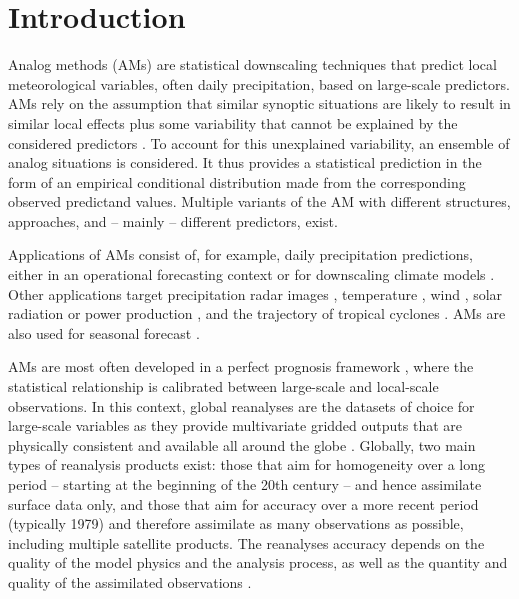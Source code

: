 \documentclass[alpha-refs]{wiley-article}
\begin{document}
\linenumbers

\section{Introduction}

Analog methods (AMs) are statistical downscaling techniques that predict local meteorological variables, often daily precipitation, based on large-scale predictors. AMs rely on the assumption that similar synoptic situations are likely to result in similar local effects plus some variability that cannot be explained by the considered predictors \citep{Lorenz1969}. To account for this unexplained variability, an ensemble of analog situations is considered. It thus provides a statistical prediction in the form of an empirical conditional distribution made from the corresponding observed predictand values. Multiple variants of the AM with different structures, approaches, and -- mainly -- different predictors, exist.

Applications of AMs consist of, for example, daily precipitation predictions, either in an operational forecasting context \citep[e.g.][]{Bontron2005, Hamill2006, Bliefernicht2010, Marty2012, Horton2012, Hamill2015, BenDaoud2016} or for downscaling climate models \citep[e.g.][]{Zorita1999, Wetterhall2005, Wetterhall2007, Matulla2007, Radanovics2013, Chardon2014, Dayon2015, Raynaud2016b}. Other applications target precipitation radar images \citep{Panziera2011, Foresti2015a}, temperature \citep{Kruizinga1983, DelleMonache2013, Caillouet2016, Raynaud2016b}, wind \citep{DelleMonache2013, DelleMonache2011, Vanvyve2015, Alessandrini2015, Junk2015, Junk2015c}, solar radiation or power production \citep{Alessandrini2015a, Bessa2015, Raynaud2016b}, and the trajectory of tropical cyclones \citep{Sievers2000, Fraedrich2003}. AMs are also used for seasonal forecast \citep{Xavier2007, Charles2012, Wu2012, Shao2013}.

AMs are most often developed in a perfect prognosis framework \citep{Rummukainen1997, Maraun2010}, where the statistical relationship is calibrated between large-scale and local-scale observations. In this context, global reanalyses are the datasets of choice for large-scale variables as they provide multivariate gridded outputs that are physically consistent and available all around the globe \citep{Gelaro2017}. Globally, two main types of reanalysis products exist: those that aim for homogeneity over a long period -- starting at the beginning of the 20th century -- and hence assimilate surface data only, and those that aim for accuracy over a more recent period (typically 1979) and therefore assimilate as many observations as possible, including multiple satellite products. The reanalyses accuracy depends on the quality of the model physics and the analysis process, as well as the quantity and quality of the assimilated observations \citep{Dee2011a}.
\end{document}
